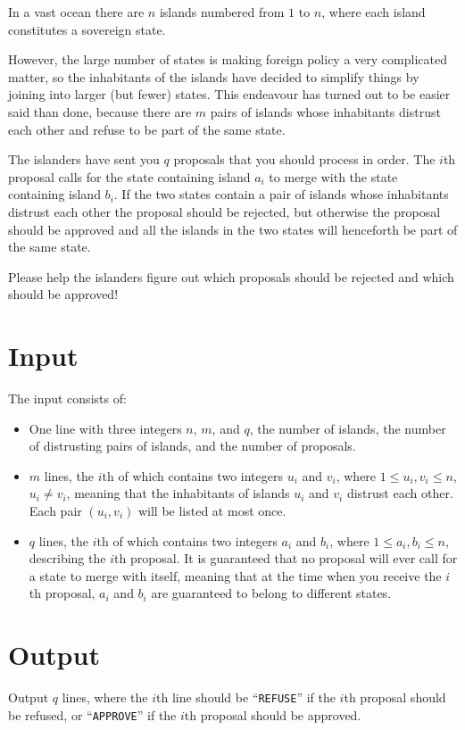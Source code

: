 In a vast ocean there are $n$ islands numbered from $1$ to $n$, where each
island constitutes a sovereign state.

However, the large number of states is making foreign policy a very complicated
matter, so the inhabitants of the islands have decided to simplify things by
joining into larger (but fewer) states. This endeavour has turned out to be
easier said than done, because there are $m$ pairs of islands whose inhabitants
distrust each other and refuse to be part of the same state.

The islanders have sent you $q$ proposals that you should process in order. The
$i$th proposal calls for the state containing island $a_i$ to merge with the
state containing island $b_i$. If the two states contain a pair of islands
whose inhabitants distrust each other the proposal should be rejected, but
otherwise the proposal should be approved and all the islands in the two states
will henceforth be part of the same state.

Please help the islanders figure out which proposals should be rejected and
which should be approved!

\section*{Input}
The input consists of:
\begin{itemize}
  \item One line with three integers $n$, $m$, and $q$, the number of islands, the number of distrusting pairs of
        islands, and the number of proposals.
  \item $m$ lines, the $i$th of which contains two integers $u_i$ and $v_i$, where $1
        \leq u_i,v_i \leq n$, $u_i \neq v_i$, meaning that the inhabitants of
        islands $u_i$ and $v_i$ distrust each other. Each pair $(u_i, v_i)$ will be
        listed at most once.
  \item $q$ lines, the $i$th of which contains two integers $a_i$ and $b_i$, where $1
        \leq a_i,b_i \leq n$, describing the $i$th proposal. It is guaranteed
        that no proposal will ever call for a state to merge with itself, meaning
        that at the time when you receive the $i$th proposal, $a_i$ and $b_i$ are
        guaranteed to belong to different states.
\end{itemize}

\section*{Output}
Output $q$ lines, where the $i$th line should be ``\texttt{REFUSE}'' if the $i$th
proposal should be refused, or ``\texttt{APPROVE}'' if the $i$th proposal should
be approved.


